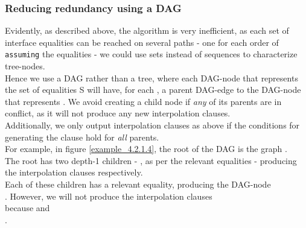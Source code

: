 \subsubsection*{Reducing redundancy using a DAG}
Evidently, as described above, the algorithm is very inefficient, as each set of interface equalities can be reached on several paths - one for each order of \lstinline|assuming| the equalities - we could use sets instead of sequences to characterize tree-nodes.\\
Hence we use a DAG rather than a tree, where each DAG-node that represents the set of equalities S will have, for each , 
a parent DAG-edge to the DAG-node that represents .
We avoid creating a child node if \emph{any} of its parents are in conflict, as it will not produce any new interpolation clauses.\\
Additionally, we only output interpolation clauses as above if the conditions for generating the clause hold for \emph{all} parents.\\
For example, in figure \ref{example_4.2.1.4}, the root of the DAG is the graph .\\
The root has two depth-1 children - , as per the relevant equalities - producing the interpolation clauses 
 respectively.\\
Each of these children has a relevant equality, producing the DAG-node \\
.
However, we will not produce the interpolation clauses \\
 because
 and\\
 .

